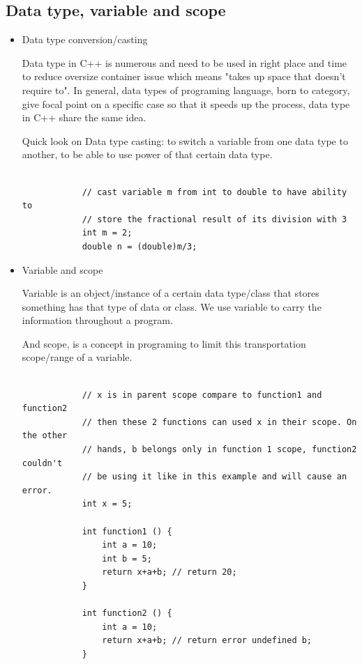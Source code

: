 \documentclass[english]{article}
\begin{document}
{\subsection{Data type, variable and scope}
	
	\begin{itemize}
		\item Data type conversion/casting
		
		Data type in C++ is numerous and need to be used in right place and time to reduce oversize container issue which means "takes up space that doesn't require to". In general, data types of programing language, born to category, give focal point on a specific case so that it speeds up the process, data type in C++ share the same idea.
		
		Quick look on Data type casting: to switch a variable from one data type to another, to be able to use power of that certain data type.
		
		\lstset{language=C++}
		\begin{lstlisting}
		
			// cast variable m from int to double to have ability to  
			// store the fractional result of its division with 3
			int m = 2;
			double n = (double)m/3;
		\end{lstlisting}
		
		\item Variable and scope
		
		Variable is an object/instance of a certain data type/class that stores something has that type of data or class. We use variable to carry the information throughout a program.
		
		And scope, is a concept in programing to limit this transportation scope/range of a variable.
		
		\lstset{language=C++}
		\begin{lstlisting}
			
			// x is in parent scope compare to function1 and function2
			// then these 2 functions can used x in their scope. On the other
			// hands, b belongs only in function 1 scope, function2 couldn't
			// be using it like in this example and will cause an error.
			int x = 5;
			
			int function1 () {
				int a = 10;
				int b = 5;
				return x+a+b; // return 20;
			}
			
			int function2 () {
				int a = 10;
				return x+a+b; // return error undefined b;
			}
		\end{lstlisting}
		

\end{itemize}}
\end{document}

